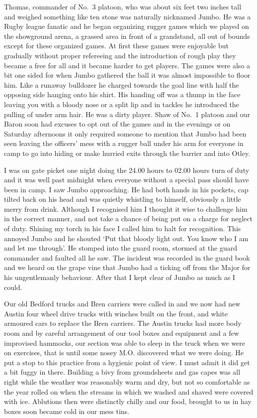 \Lieutenant Thomas, commander of No.~3 platoon, who was about six feet
two inches tall and weighed something like ten stone was naturally
nicknamed Jumbo. He was a Rugby league fanatic and he began
organizing rugger games which we played on the showground arena, a
grassed area in front of a grandstand, all out of bounds except for
these organized games. At first these games were enjoyable but
gradually without proper refereeing and the introduction of rough play
they became a free for all and it became harder to get players. The
games were also a bit one sided for when Jumbo gathered the ball it
was almost impossible to floor him. Like a runaway bulldozer he
charged towards the goal line with half the opposing side hanging onto
his shirt. His handing off was a thump in the face leaving you with a
bloody nose or a split lip and in tackles he introduced the pulling of
under arm hair. He was a dirty player. \Lieutenant Shaw of No.~1
platoon and our \lieutenant Baron soon had excuses to opt out of the
games and in the evenings or on Saturday afternoons it only required
someone to mention that Jumbo had been seen leaving the officers' mess
with a rugger ball under his arm for everyone in camp to go into
hiding or make hurried exits through the barrier and into Otley.

I was on gate picket one night doing the 24.00 hours to 02.00 hours
turn of duty and it was well past midnight when everyone without a
special pass should have been in camp. I saw Jumbo approaching. He had
both hands in his pockets, cap tilted back on his head and was quietly
whistling to himself, obviously a little merry from drink.  Although I
recognised him I thought it wise to challenge him in the correct
manner, and not take a chance of being put on a charge for neglect of
duty. Shining my torch in his face I called him to halt for
recognition. This annoyed Jumbo and he shouted `Put that bloody light
out. You know who I am and let me through'. He stomped into the guard
room, stormed at the guard commander and faulted all he saw.  The
incident was recorded in the guard book and we heard on the grape vine
that Jumbo had a ticking off from the Major for his ungentlemanly
behaviour. After that I kept clear of Jumbo as much as I could.

Our old Bedford trucks and Bren carriers were called in and we now had
new Austin four wheel drive trucks with winches built on the front,
and white armoured cars to replace the Bren carriers. The Austin
trucks had more body room and by careful arrangement of our tool boxes
and equipment and a few improvised hammocks, our section was able to
sleep in the truck when we were on exercises, that is until some nosey
M.O. discovered what we were doing. He put a stop to this practice
from a hygienic point of view. I must admit it did get a bit fuggy in
there. Building a bivy from groundsheets and gas capes was all right
while the weather was reasonably warm and dry, but not so comfortable
as the year rolled on when the streams in which we washed and shaved
were covered with ice. Ablutions then were distinctly chilly and our
food, brought to us in hay boxes soon became cold in our mess tins.


